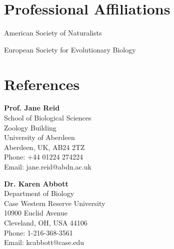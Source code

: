 \documentclass[letterpaper]{article}
\renewenvironment{itemize}{
  \begin{list}{}{
    \setlength{\leftmargin}{1.5em}
  }
}{
  \end{list}
}
\begin{document}
\section*{Professional Affiliations}
\begin{itemize}
\item American Society of Naturalists
\item European Society for Evolutionary Biology
\end{itemize}

\section*{References}

\begin{minipage}{0.5\linewidth}

\begin{itemize}
\item {\bf Prof. Jane Reid} \\
School of Biological Sciences \\
Zoology Building \\
University of Aberdeen \\
Aberdeen, UK, AB24 2TZ \\
Phone: +44 01224 274224 \\
Email: jane.reid@abdn.ac.uk \\

\item {\bf Dr. Karen Abbott} \\
Department of Biology \\
Case Western Reserve University \\
10900 Euclid Avenue \\
Cleveland, OH, USA 44106 \\
Phone: 1-216-368-3561 \\
Email: kcabbott@case.edu \\

\end{itemize}
\end{minipage}
\end{document}
